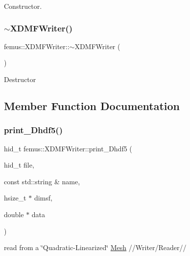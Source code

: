 Constructor. \mbox{\label{classfemus_1_1_x_d_m_f_writer_ae9386a697a2fcba2b0d34ff76f3a47f5}} 
\subsubsection{\texorpdfstring{$\sim$\+X\+D\+M\+F\+Writer()}{~XDMFWriter()}}
{\footnotesize\ttfamily femus\+::\+X\+D\+M\+F\+Writer\+::$\sim$\+X\+D\+M\+F\+Writer (\begin{DoxyParamCaption}{ }\end{DoxyParamCaption})\hspace{0.3cm}{\ttfamily [virtual]}}

Destructor 

\subsection{Member Function Documentation}
\mbox{\label{classfemus_1_1_x_d_m_f_writer_a4d7857af4417135d9fd207eebc8d6dda}} 
\subsubsection{\texorpdfstring{print\+\_\+\+Dhdf5()}{print\_Dhdf5()}}
{\footnotesize\ttfamily hid\+\_\+t femus\+::\+X\+D\+M\+F\+Writer\+::print\+\_\+\+Dhdf5 (\begin{DoxyParamCaption}\item[{hid\+\_\+t}]{file,  }\item[{const std\+::string \&}]{name,  }\item[{hsize\+\_\+t $\ast$}]{dimsf,  }\item[{double $\ast$}]{data }\end{DoxyParamCaption})\hspace{0.3cm}{\ttfamily [static]}}



read from a \char`\"{}\+Quadratic-\/\+Linearized\char`\"{} \mbox{\hyperlink{classfemus_1_1_mesh}{Mesh}} //\+Writer/\+Reader// 

